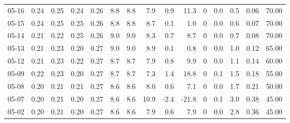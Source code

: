 \begin{threeparttable}
{\begin{tabular}{lrrrrrrrrrrrrrr}
  05-16 &          0.24 &          0.25 &          0.24 &        0.26 &                 8.8 &                8.8 &                 7.9 &        0.9 &         11.3 &              0 &                 0.0 &              0.5 &            0.06 &                  70.00 \\
  05-15 &          0.24 &          0.25 &          0.25 &        0.26 &                 8.8 &                8.8 &                 8.7 &        0.1 &          1.0 &              0 &                 0.0 &              0.6 &            0.07 &                  70.00 \\
  05-14 &          0.21 &          0.22 &          0.25 &        0.26 &                 9.0 &                9.0 &                 8.3 &        0.7 &          8.7 &              0 &                 0.0 &              0.7 &            0.08 &                  70.00 \\
  05-13 &          0.21 &          0.23 &          0.20 &        0.27 &                 9.0 &                9.0 &                 8.9 &        0.1 &          0.8 &              0 &                 0.0 &              1.0 &            0.12 &                  65.00 \\
  05-12 &          0.21 &          0.23 &          0.22 &        0.27 &                 8.7 &                8.7 &                 7.9 &        0.8 &          9.9 &              0 &                 0.0 &              1.1 &            0.14 &                  60.00 \\
  05-09 &          0.22 &          0.23 &          0.20 &        0.27 &                 8.7 &                8.7 &                 7.3 &        1.4 &         18.8 &              0 &                 0.1 &              1.5 &            0.18 &                  55.00 \\
  05-08 &          0.20 &          0.21 &          0.21 &        0.27 &                 8.6 &                8.6 &                 8.0 &        0.6 &          7.1 &              0 &                 0.0 &              1.7 &            0.21 &                  50.00 \\
  05-07 &          0.20 &          0.21 &          0.20 &        0.27 &                 8.6 &                8.6 &                10.9 &       -2.4 &        -21.8 &              0 &                 0.1 &              3.0 &            0.38 &                  45.00 \\
  05-02 &          0.20 &          0.21 &          0.20 &        0.27 &                 8.6 &                8.6 &                 7.9 &        0.6 &          7.9 &              0 &                 0.0 &              2.8 &            0.36 &                  45.00 \\

\end{tabular}}
\end{threeparttable}
